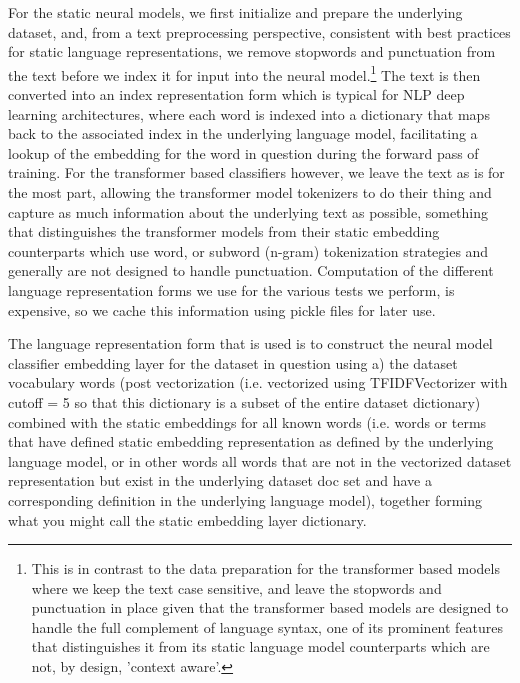 \documentclass[final]{clv2025-revised}
\begin{document}
For the static neural models, we first initialize and prepare the underlying dataset, and, from a text preprocessing perspective, consistent with best practices for static language representations, we remove stopwords and punctuation from the text before we index it for input into the neural model.\footnote{This is in contrast to the data preparation for the transformer based models where we keep the text case sensitive, and leave the stopwords and punctuation in place given that the transformer based models are designed to handle the full complement of language syntax, one of its prominent features that distinguishes it from its static language model counterparts which are not, by design, 'context aware'.} The text is then converted into an index representation form which is typical for NLP deep learning architectures, where each word is indexed into a dictionary that maps back to the associated index in the underlying language model, facilitating a lookup of the embedding for the word in question during the forward pass of training. For the transformer based classifiers however, we leave the text as is for the most part, allowing the transformer model tokenizers to do their thing and capture as much information about the underlying text as possible, something that distinguishes the transformer models from their static embedding counterparts which use word, or subword (n-gram) tokenization strategies and generally are not designed to handle punctuation. Computation of the different language representation forms we use for the various tests we perform, is expensive, so we cache this information using pickle files for later use. 

The language representation form that is used is to construct the neural model classifier embedding layer for the dataset in question using a) the dataset vocabulary words (post vectorization (i.e. vectorized using TFIDFVectorizer with cutoff = 5 so that this dictionary is a subset of the entire dataset dictionary) combined with the static embeddings for all known words (i.e. words or terms that have defined static embedding representation as defined by the underlying language model, or in other words all words that are not in the vectorized dataset representation but exist in the underlying dataset doc set and have a corresponding definition in the underlying language model), together forming what you might call the static embedding layer dictionary. 
\end{document}
